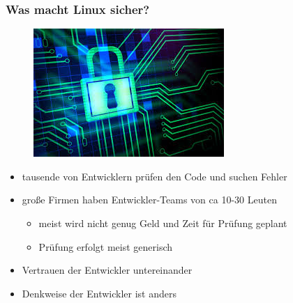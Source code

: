 \begin{frame}
\frametitle{Was macht Linux sicher?}
\begin{figure}
\includegraphics[scale=0.33]{resources/sec.jpeg}
\end{figure}
\begin{itemize}
	\item tausende von Entwicklern prüfen den Code und suchen Fehler
	\item große Firmen haben Entwickler-Teams von ca 10-30 Leuten 
	\begin{itemize}
		\item meist wird nicht genug Geld und Zeit für Prüfung geplant
		\item Prüfung erfolgt meist generisch
	\end{itemize}
	\item Vertrauen der Entwickler untereinander
	\item Denkweise der Entwickler ist anders
\end{itemize}
\end{frame}


